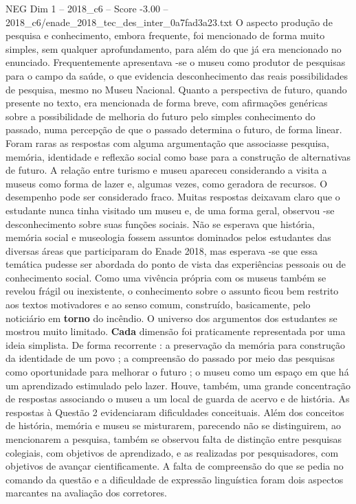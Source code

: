\begin{textsample}{NEG Dim 1 – 2018\_c6 – Score -3.00 – 2018\_c6/enade\_2018\_tec\_des\_inter\_0a7fad3a23.txt}
O aspecto produção de pesquisa e conhecimento, embora frequente, foi mencionado de forma muito simples, sem qualquer aprofundamento, para além do que já era mencionado no enunciado.
Frequentemente apresentava -se o museu como produtor de pesquisas para o campo da saúde, o que evidencia desconhecimento das reais possibilidades de pesquisa, mesmo no Museu Nacional.
Quanto a perspectiva de futuro, quando presente no texto, era mencionada de forma breve, com afirmações genéricas sobre a possibilidade de melhoria do futuro pelo simples conhecimento do passado, numa percepção de que o passado determina o futuro, de forma linear.
Foram raras as respostas com alguma argumentação que associasse pesquisa, memória, identidade e reflexão social como base para a construção de alternativas de futuro.
A relação entre turismo e museu apareceu considerando a visita a museus como forma de lazer e, algumas vezes, como geradora de recursos.
O desempenho pode ser considerado fraco.
Muitas respostas deixavam claro que o estudante nunca tinha visitado um museu e, de uma forma geral, observou -se desconhecimento sobre suas funções sociais.
Não se esperava que história, memória social e museologia fossem assuntos dominados pelos estudantes das diversas áreas que participaram do Enade 2018, mas esperava -se que essa temática pudesse ser abordada do ponto de vista das experiências pessoais ou de conhecimento social.
Como uma vivência própria com os museus também se revelou frágil ou inexistente, o conhecimento sobre o assunto ficou bem restrito aos textos motivadores e ao senso comum, construído, basicamente, pelo noticiário em \textbf{torno} do incêndio.
O universo dos argumentos dos estudantes se mostrou muito limitado. \textbf{Cada} dimensão foi praticamente representada por uma ideia simplista.
De forma recorrente : a preservação da memória para construção da identidade de um povo ; a compreensão do passado por meio das pesquisas como oportunidade para melhorar o futuro ; o museu como um espaço em que há um aprendizado estimulado pelo lazer.
Houve, também, uma grande concentração de respostas associando o museu a um local de guarda de acervo e de história.
As respostas à Questão 2 evidenciaram dificuldades conceituais.
Além dos conceitos de história, memória e museu se misturarem, parecendo não se distinguirem, ao mencionarem a pesquisa, também se observou falta de distinção entre pesquisas colegiais, com objetivos de aprendizado, e as realizadas por pesquisadores, com objetivos de avançar cientificamente.
A falta de compreensão do que se pedia no comando da questão e a dificuldade de expressão linguística foram dois aspectos marcantes na avaliação dos corretores.

\end{textsample}
